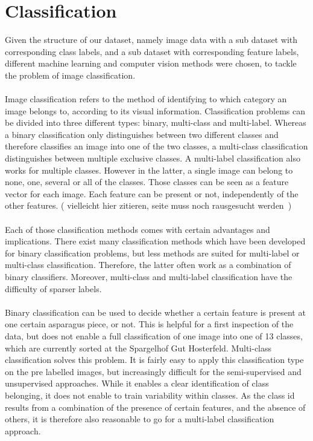 %
\section{Classification}

Given the structure of our dataset, namely image data with a sub dataset with corresponding class labels, and a sub dataset with corresponding feature labels, different machine learning and computer vision methods were chosen, to tackle the problem of image classification. \\
\\
Image classification refers to the method of identifying to which category an image belongs to, according to its visual information.  Classification problems can be divided into three different types: binary, multi-class and multi-label. Whereas a binary classification only distinguishes between two different classes and therefore classifies an image into one of the two classes, a multi-class classification distinguishes between multiple exclusive classes. A multi-label classification also works for multiple classes. However in the latter, a single image can belong to none, one, several or all of the classes. Those classes can be seen as a feature vector for each image. Each feature can be present or not, independently of the other features. ( vielleicht hier zitieren, seite muss noch rausgesucht werden~\citep{har2003constraint}) \\
\\
Each of those classification methods comes with certain advantages and implications.
There exist many classification methods which have been developed for binary classification problems, but less methods are suited for multi-label or multi-class classification. Therefore, the latter often work as a combination of binary classifiers. Moreover, multi-class and multi-label classification have the difficulty of sparser labels.  \\
\\
Binary classification can be used to decide whether a certain feature is present at one certain asparagus piece, or not. This is helpful for a first inspection of the data, but does not enable a full classification of one image into one of 13 classes, which are currently sorted at the Spargelhof Gut Hosterfeld. Multi-class classification solves this problem. It is fairly easy to apply this classification type on the pre labelled images, but increasingly difficult for the semi-supervised and unsupervised approaches. While it enables a clear identification of class belonging, it does not enable to train variability within classes. As the class id results from a combination of the presence of certain features, and the absence of others, it is therefore also reasonable to go for a multi-label classification approach.  \\
